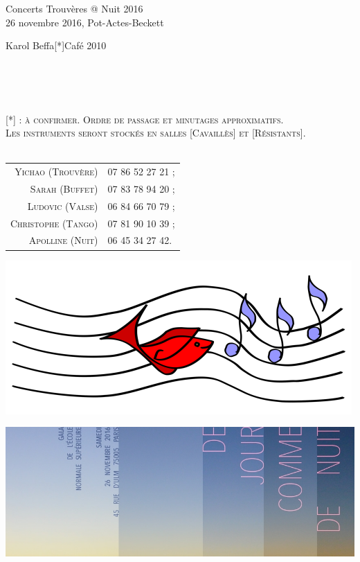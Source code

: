\documentclass[a4paper,11pt,poets,durations]{ConcProg}
\begin{document}
{\begin{programme}{
    Concerts Trouvères @ Nuit 2016
\\  {\normalsize 26 novembre 2016, Pot-Actes-Beckett}
}
\begin{part}[]
\begin{composition}{Karol Beffa}{}{[*]Café 2010}{}
    \end{composition}\\
~\\
~\\
\begin{center}
\textsc{[*] : à confirmer. Ordre de passage et minutages approximatifs.\\Les instruments seront stockés en salles [Cavaillès] et [Résistants].}\\
~\\
\begin{tabular}{rl}
\textsc{Yichao (Trouvère)} & \textsc{07 86 52 27 21 ;}\\
\textsc{Sarah (Buffet)} & \textsc{07 83 78 94 20 ;}\\
\textsc{Ludovic (Valse)} & \textsc{06 84 66 70 79 ;}\\
\textsc{Christophe (Tango)} & \textsc{07 81 90 10 39 ;}\\
\textsc{Apolline (Nuit)} & \textsc{06 45 34 27 42.}
\end{tabular}
\end{center}
  \end{part}
\end{programme}
}
\begin{center}
\includegraphics[scale=3]{logo.png}
\end{center}
\begin{center}
\includegraphics[scale=0.4]{logoNuit.jpg}
\end{center}
\end{document}
